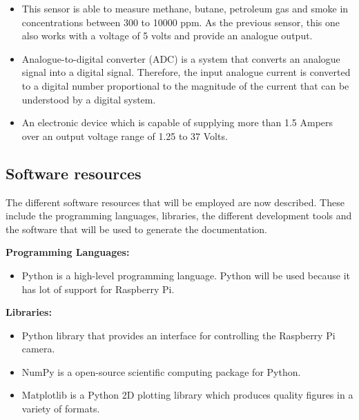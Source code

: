 \documentclass{pre-tfg}
\begin{document}
\begin{itemize}[noitemsep,nolistsep]
	\item {} This sensor is able to measure methane, butane, petroleum gas and smoke in concentrations between 300 to 10000 ppm. As the previous sensor, this one also works with a voltage of 5 volts and provide an analogue output.
	
	\item {} Analogue-to-digital converter (ADC) is a system that converts an analogue signal into a digital signal. Therefore, the input analogue current is converted to a digital number proportional to the magnitude of the current that can be understood by a digital system.	
	
	\item {} An electronic device which is capable of supplying more than 1.5 Ampers over an output voltage range of 1.25 to 37 Volts.
	
\end{itemize} 



\subsection{Software resources}
The different software resources that will be employed are now described. These include the programming languages, libraries, the different development tools and the software that will be used to generate the documentation. \vspace{-2mm}

\textbf{Programming Languages:} \vspace{-4mm}
\begin{itemize}[noitemsep,nolistsep]
	\item {} Python is a high-level programming language.  Python will be used because it has lot of support for Raspberry Pi.
	
\end{itemize} \vspace{-2mm}

\textbf{Libraries:} \vspace{-4mm}
\begin{itemize}[noitemsep,nolistsep]
	\item {} Python library that provides an interface for controlling the Raspberry Pi camera.
	
	\item {} NumPy is a open-source scientific computing package for Python.
	
	\item {} Matplotlib is a Python 2D plotting library which produces quality figures in a variety of formats.
	
\end{itemize} \vspace{-2mm}
\end{document}
